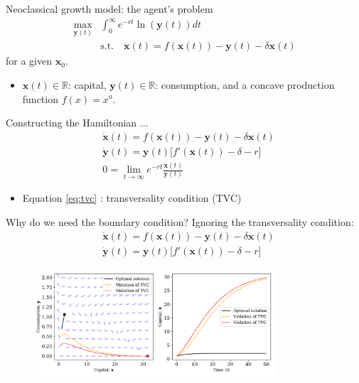 \documentclass[aspectratio=169,10pt]{beamer}
\begin{document}
\begin{frame}{Neoclassical growth model: the agent's problem}
	\begin{align*}
		\max_{\mathbf{y}(t)} &\int_0^\infty e^{-rt}\ln(\mathbf{y}(t))dt\\
		& \text{s.t.} \quad \dot{\mathbf{x}}(t) = f(\mathbf{x}(t)) - \mathbf{y}(t)-\delta \mathbf{x}(t)
	\end{align*}
for a given $\mathbf{x}_0$.
\begin{itemize}
	\item $\mathbf{x}(t)\in \mathbb{R}$: capital, $\mathbf{y}(t)\in \mathbb{R}$: consumption, and a concave production function $f(x) = x^a$.
	\vspace{0.1in}
\end{itemize}

Constructing the Hamiltonian ...
	\begin{align}
		&\dot{\mathbf{x}}(t) = f(\mathbf{x}(t)) - \mathbf{y}(t)-\delta \mathbf{x}(t)\\
		&\dot{\mathbf{y}}(t) = \mathbf{y}(t)\big[f'(\mathbf{x}(t)) -\delta -r\big]\\
		& 0 = \lim_{t\rightarrow \infty} e^{-rt}\frac{\mathbf{x}(t)}{\mathbf{y}(t)}
		\label{eq:tvc}
	\end{align}
	\begin{itemize}
		\item Equation \cref{eq:tvc} : transversality condition (TVC)
	\end{itemize}
\end{frame}

\begin{frame}{Why do we need the boundary condition?}
	Ignoring the transversality condition:
\begin{align*}
	&\dot{\mathbf{x}}(t) = f(\mathbf{x}(t)) - \mathbf{y}(t)-\delta \mathbf{x}(t)\\
	&\dot{\mathbf{y}}(t) = \mathbf{y}(t)\big[f'(\mathbf{x}(t)) -\delta -r\big]
\end{align*}
	\begin{figure}[t!]
		\centering
		\vspace{-4mm}
		\includegraphics[width=0.8\textwidth]{figs/TVC_violate.pdf}
		\vspace{-4mm}
	\end{figure}
\end{frame}
\end{document}
